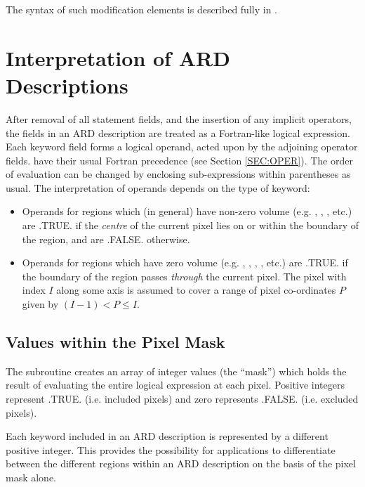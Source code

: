 The syntax of such modification elements is described fully in .

\section{Interpretation of ARD Descriptions}
After removal of all statement fields, and the insertion of any implicit 
operators, the fields in an ARD description are treated as a Fortran-like
logical expression. Each keyword field forms a logical operand, acted upon by
the adjoining operator fields.  have their usual Fortran precedence
(see Section \ref{SEC:OPER}). The order of evaluation can be changed by
enclosing sub-expressions within parentheses as usual. The interpretation of
operands depends on the type of keyword: 

\begin{itemize}

\item Operands for regions which (in general) have non-zero volume (e.g.
,
, , etc.) are .TRUE. if the {\em centre} of the current pixel lies on or
within the boundary of the region, and are .FALSE. otherwise. 

\item Operands for regions which have zero volume (e.g.
,
, , ,
etc.) are .TRUE. if the boundary of the region passes {\em through} the current
pixel. The pixel with index $I$ along some axis is assumed to cover a range of
pixel co-ordinates $P$ given by $(I-1) < P \leq I$.

\end{itemize}

\subsection{Values within the Pixel Mask}
The  subroutine creates an array of integer values (the ``mask'') which
holds the result of evaluating the entire logical expression at each pixel.
Positive integers represent .TRUE. (i.e. included pixels) and zero represents
.FALSE. (i.e. excluded pixels). 

Each keyword included in an ARD description is represented by a different
positive integer. This provides the possibility for applications to
differentiate between the different regions within an ARD description on the
basis of the pixel mask alone. 

